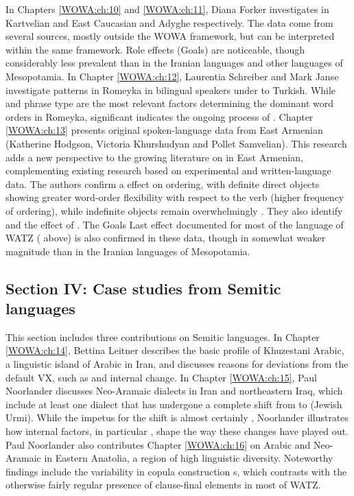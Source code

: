 \documentclass[output=paper,colorlinks,citecolor=brown,collectionchapter]{langscibook}
\begin{document}
In Chapters \ref{WOWA:ch:10} and \ref{WOWA:ch:11}, Diana Forker investigates  in Kartvelian and East Caucasian and Adyghe respectively. The data come from several sources, mostly outside the WOWA framework, but can be interpreted within the same framework. Role effects (Goals) are noticeable, though considerably less prevalent than in the Iranian languages and other languages of Mesopotamia. In Chapter \ref{WOWA:ch:12}, Laurentia Schreiber and Mark Janse investigate  patterns in Romeyka in bilingual speakers under  to Turkish. While  and phrase type are the most relevant factors determining the dominant word orders in Romeyka, significant  indicates the ongoing process of . Chapter \ref{WOWA:ch:13} presents original spoken-language data from East Armenian (Katherine Hodgson, Victoria Khurshudyan and Pollet Samvelian). This research adds a new perspective to the growing literature on  in East Armenian, complementing existing research based on experimental and written-language data. The authors confirm a  effect on  ordering, with definite direct objects showing greater word-order flexibility with respect to the verb (higher frequency of  ordering), while indefinite objects remain overwhelmingly . They also identify  and the effect of . The Goals Last effect documented for most of the language of WATZ ( above) is also confirmed in these data, though in somewhat weaker magnitude than in the Iranian languages of Mesopotamia.

\subsection{Section IV: Case studies from Semitic languages}\label{Intro:ss:7.4}

This section includes three contributions on Semitic languages. In Chapter \ref{WOWA:ch:14}, Bettina Leitner describes the basic  profile of Khuzestani Arabic, a linguistic island of Arabic in Iran, and discusses reasons for deviations from the default  VX, such as  and internal change. In Chapter \ref{WOWA:ch:15}, Paul Noorlander discusses Neo-Aramaic dialects in Iran and northeastern Iraq, which include at least one dialect that has undergone a complete shift from  to  (Jewish Urmi). While the impetus for the shift is almost certainly , Noorlander illustrates how internal factors, in particular , shape the way these changes have played out. Paul Noorlander also contributes Chapter \ref{WOWA:ch:16} on Arabic and Neo-Aramaic in Eastern Anatolia, a region of high linguistic diversity. Noteworthy findings include the variability in copula construction
s, which contrasts with the otherwise fairly regular presence of clause-final  elements in most of WATZ. 
\end{document}
